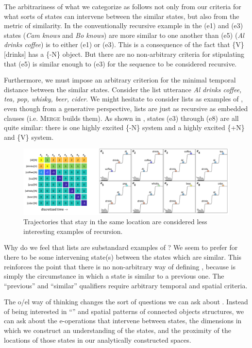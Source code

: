   The arbitrariness of what we categorize as  follows not only from our criteria for what sorts of states can intervene between the similar states, but also from the metric of similarity. In the conventionally recursive example in {} the (e1) and (e3) states (\textit{Cam knows} and \textit{Bo knows}) are more similar to one another than (e5) (\textit{Al drinks coffee}) is to either (e1) or (e3). This is a consequence of the fact that \{V\}[drinks] has a \{-N\} object. But there are no non-arbitrary criteria for stipulating that (e5) is similar enough to (e3) for the sequence to be considered recursive.

  Furthermore, we must impose an arbitrary criterion for the minimal temporal distance between the similar states. Consider the list utterance \textit{Al drinks coffee, tea, pop, whisky, beer, cider}. We might hesitate to consider lists as examples of , even though from a generative perspective, lists are just as recursive as embedded clauses (i.e. \textsc{Merge} builds them). As shown in {}, states (e3) through (e8) are all quite similar: there is one highly excited \{-N\} system and a highly excited \{+N\} and \{V\} system.

  
\begin{figure}
\includegraphics[width=\textwidth]{figures/Tilsen-img114.png}
\caption{Trajectories that stay in the same location are considered less interesting examples of recursion.}
\label{fig:5:10}
\end{figure}
 

  Why do we feel that lists are substandard examples of ? We seem to prefer for there to be some intervening state(s) between the states which are similar. This reinforces the point that there is no non-arbitrary way of defining , because  is simply the circumstance in which a state is similar to a previous one. The “previous” and “similar” qualifiers require arbitrary temporal and spatial criteria. 

  The o/el way of thinking changes the sort of questions we can ask about . Instead of being interested in “” and spatial patterns of connected objects structures, we can ask about the e-operations that intervene between states, the dimensions in which we construct an understanding of the states, and the proximity of the locations of those states in our analytically constructed spaces.


